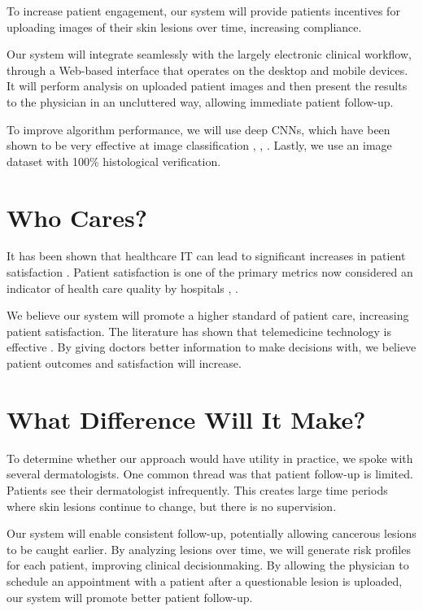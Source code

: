\documentclass[a4paper,12pt]{article}
\begin{document}
To increase patient engagement, our system will provide patients incentives
for uploading images of their skin lesions over time, increasing compliance.

Our system will integrate seamlessly with the largely electronic clinical
workflow, through a Web-based interface that operates on the desktop and mobile
devices. It will perform analysis on uploaded patient images and then present
the results to the physician in an uncluttered way, allowing immediate patient
follow-up.

To improve algorithm performance, we will use deep CNNs, which have been shown
to be very effective at image classification \cite{krizhevsky2012imagenet},
\cite{szegedy2015rethinking}, \cite{simonyan2014very}. Lastly, we use an image
dataset with 100\% histological verification.

\section{Who Cares?}
It has been shown that healthcare IT can lead to significant increases in
patient satisfaction \cite{roham2012predicting}. Patient satisfaction is one of
the primary metrics now considered an indicator of health care quality by
hospitals \cite{fenton2012cost}, \cite{bjertnaes2012overall}.

We believe our system will promote a higher standard of patient care, increasing
patient satisfaction. The literature has shown that telemedicine technology is
effective \cite{hilty2013effectiveness}. By giving doctors better information
to make decisions with, we believe patient outcomes and satisfaction will
increase.

\section{What Difference Will It Make?}
To determine whether our approach would have utility in practice, we spoke with
several dermatologists. One common thread was that patient follow-up is limited.
Patients see their dermatologist infrequently. This creates large time periods
where skin lesions continue to change, but there is no supervision.

Our system will enable consistent follow-up, potentially allowing cancerous
lesions to be caught earlier. By analyzing lesions over time, we will generate
risk profiles for each patient, improving clinical decisionmaking. By allowing
the physician to schedule an appointment with a patient after a questionable
lesion is uploaded, our system will promote better patient follow-up.
\end{document}
